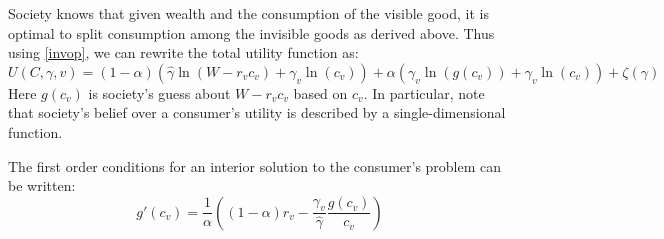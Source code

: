 \documentclass[12pt]{article}
\begin{document}
Society knows that given wealth and the consumption of the visible good, it is optimal to split consumption among the invisible goods as derived above.  Thus using \eqref{invop}, we can rewrite the total utility function as: 
\begin{equation}
	\label{ufun}
	U(C,\gamma,v) = (1-\alpha) \left(\hat{\gamma} \ln \left(W-r_v c_v\right) + \gamma_v \ln \left(c_v \right)\right) + \alpha \left(\gamma_v \ln \left(g(c_v)\right) + \gamma_v \ln \left(c_v\right) \right) + \zeta(\gamma)
	 \end{equation}
Here $g(c_v)$ is society's guess about $W-r_v c_v$ based on $c_v$. 
In particular, note that society's belief over a consumer's utility is described by a single-dimensional function.

The first order conditions for an interior solution to the consumer's problem can be written:
\begin{equation}
	\label{foc}
g'(c_v) = \frac{1}{\alpha}\left( \left( 1-\alpha\right) r_v - \frac{\gamma_v}{\hat{\gamma}}\frac{g(c_v)}{c_v }\right)
\end{equation}
\end{document}
